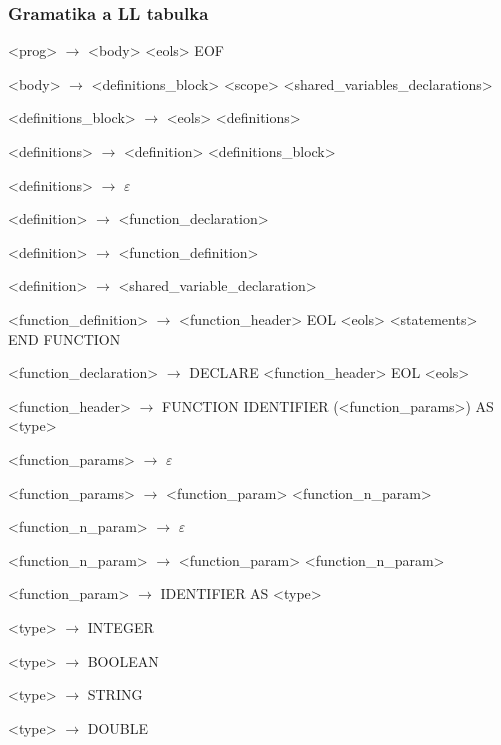 \subsubsection{Gramatika a LL tabulka}
\begin{normalsize}
    \begin{enumerate}
        {\small
        \item <prog> $\rightarrow$ <body> <eols> EOF
        \item <body> $\rightarrow$ <definitions\_block> <scope> <shared\_variables\_declarations>

        \item <definitions\_block> $\rightarrow$ <eols> <definitions>

        \item <definitions> $\rightarrow$ <definition> <definitions\_block>
        \item <definitions> $\rightarrow$ $\varepsilon$

        \item <definition> $\rightarrow$ <function\_declaration>
        \item <definition> $\rightarrow$ <function\_definition>
        \item <definition> $\rightarrow$ <shared\_variable\_declaration>

        \item <function\_definition> $\rightarrow$ <function\_header> EOL <eols> <statements> END FUNCTION
        \item <function\_declaration> $\rightarrow$ DECLARE <function\_header> EOL <eols>

        \item <function\_header> $\rightarrow$ FUNCTION IDENTIFIER (<function\_params>) AS <type>

        \item <function\_params> $\rightarrow$ $\varepsilon$
        \item <function\_params> $\rightarrow$ <function\_param> <function\_n\_param>

        \item <function\_n\_param> $\rightarrow$ $\varepsilon$
        \item <function\_n\_param> $\rightarrow$ <function\_param> <function\_n\_param>

        \item <function\_param> $\rightarrow$ IDENTIFIER AS <type>


        \item <type> $\rightarrow$ INTEGER
        \item <type> $\rightarrow$ BOOLEAN
        \item <type> $\rightarrow$ STRING
        \item <type> $\rightarrow$ DOUBLE

}
\end{enumerate}
\end{normalsize}
